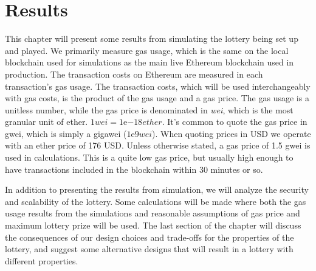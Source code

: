 \chapter{Results}
\label{chap:results}

This chapter will present some results from simulating the lottery being set up and played. We primarily measure gas usage, which is the same on the local blockchain used for simulations as the main live Ethereum blockchain used in production. The transaction costs on Ethereum are measured in each transaction's gas usage. The transaction costs, which will be used interchangeably with gas costs, is the product of the gas usage and a gas price. The gas usage is a unitless number, while the gas price is denominated in \emph{wei}, which is the most granular unit of ether. $1 wei=1 \mathrm{e}{-18} ether$. It's common to quote the gas price in gwei, which is simply a gigawei ($1\mathrm{e}{9} wei$). When quoting prices in USD we operate with an ether price of 176 USD. Unless otherwise stated, a gas price of 1.5 gwei is used in calculations. This is a quite low gas price, but usually high enough to have transactions included in the blockchain within 30 minutes or so.

In addition to presenting the results from simulation, we will analyze the security and scalability of the lottery. Some calculations will be made where both the gas usage results from the simulations and reasonable assumptions of gas price and maximum lottery prize will be used.
The last section of the chapter will discuss the consequences of our design choices and trade-offs for the properties of the lottery, and suggest some alternative designs that will result in a lottery with different properties.







